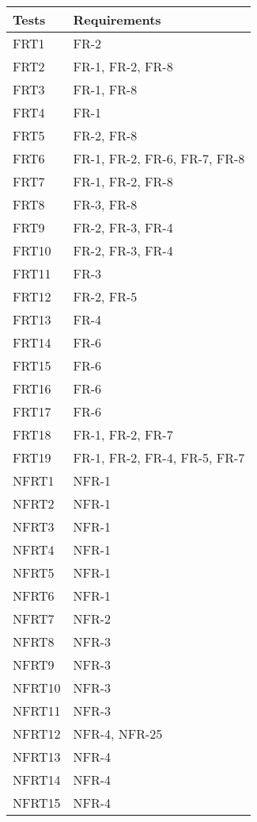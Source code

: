 \documentclass[12pt, titlepage]{article}
\begin{document}
\begin{longtable}{| p{} | p{} |} 
  \hline
  \textbf{Tests}    &   \textbf{Requirements} \\ \hline
  FRT1 &  FR-2 \\ \hline          
  FRT2 &  FR-1, FR-2, FR-8  \\ \hline
  FRT3 &   FR-1, FR-8 \\ \hline
   FRT4 &   FR-1 \\ \hline
   FRT5 &  FR-2, FR-8  \\ \hline
   FRT6 &  FR-1, FR-2, FR-6, FR-7, FR-8  \\ \hline
  FRT7  &  FR-1, FR-2, FR-8  \\ \hline
  FRT8 &  FR-3, FR-8  \\ \hline
  FRT9 &  FR-2, FR-3, FR-4  \\ \hline
  FRT10 &  FR-2, FR-3, FR-4  \\ \hline
  FRT11 &  FR-3  \\ \hline
  FRT12 &  FR-2, FR-5  \\ \hline
  FRT13 &  FR-4  \\ \hline
  FRT14 &  FR-6  \\ \hline
  FRT15 &  FR-6  \\ \hline
  FRT16 &  FR-6  \\ \hline
  FRT17 &  FR-6  \\ \hline
  FRT18 &  FR-1, FR-2, FR-7  \\ \hline
  FRT19 &  FR-1, FR-2, FR-4, FR-5, FR-7  \\ \hline
  NFRT1 &  NFR-1  \\ \hline
  NFRT2 &  NFR-1  \\ \hline
  NFRT3 &  NFR-1  \\ \hline
  NFRT4 &  NFR-1  \\ \hline
  NFRT5 &  NFR-1  \\ \hline
  NFRT6 &  NFR-1  \\ \hline
  NFRT7 &  NFR-2  \\ \hline
  NFRT8 &  NFR-3  \\ \hline
  NFRT9 &   NFR-3 \\ \hline
  NFRT10 &  NFR-3  \\ \hline
  NFRT11 &  NFR-3  \\ \hline
  NFRT12 &  NFR-4, NFR-25  \\ \hline
  NFRT13 &  NFR-4  \\ \hline
  NFRT14 &  NFR-4  \\ \hline
  NFRT15 &  NFR-4  \\ \hline

\end{longtable}
\end{document}

